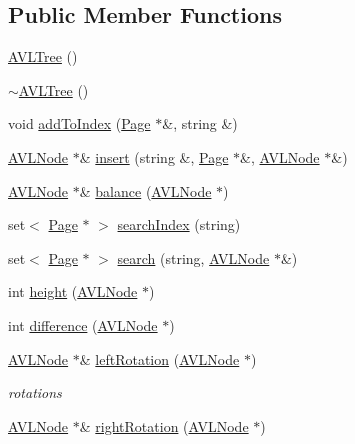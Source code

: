 \subsection*{Public Member Functions}
\begin{DoxyCompactItemize}
\item 
\hyperlink{class_a_v_l_tree_a0915d328ebed07e11087692f17d80827}{A\+V\+L\+Tree} ()
\item 
\hyperlink{class_a_v_l_tree_af4a1d1be1b6301ba59c6e101c6efc6ba}{$\sim$\+A\+V\+L\+Tree} ()
\item 
void \hyperlink{class_a_v_l_tree_acc05c3c67a02da11ae973a01c37ae89e}{add\+To\+Index} (\hyperlink{class_page}{Page} $\ast$\&, string \&)
\item 
\hyperlink{class_a_v_l_node}{A\+V\+L\+Node} $\ast$\& \hyperlink{class_a_v_l_tree_a0e9a469764ef2056ffc1257ace172612}{insert} (string \&, \hyperlink{class_page}{Page} $\ast$\&, \hyperlink{class_a_v_l_node}{A\+V\+L\+Node} $\ast$\&)
\item 
\hyperlink{class_a_v_l_node}{A\+V\+L\+Node} $\ast$\& \hyperlink{class_a_v_l_tree_a6f77603032cfc0477eae2fc8944cec75}{balance} (\hyperlink{class_a_v_l_node}{A\+V\+L\+Node} $\ast$)
\item 
set$<$ \hyperlink{class_page}{Page} $\ast$ $>$ \hyperlink{class_a_v_l_tree_a7b6bc9d63cff082843ac1de050268f2d}{search\+Index} (string)
\item 
set$<$ \hyperlink{class_page}{Page} $\ast$ $>$ \hyperlink{class_a_v_l_tree_ac439d90d1a41fc1526e5882ba25f2a5b}{search} (string, \hyperlink{class_a_v_l_node}{A\+V\+L\+Node} $\ast$\&)
\item 
int \hyperlink{class_a_v_l_tree_ad3fb38e4b3f05d203dbc1d5c87be48b0}{height} (\hyperlink{class_a_v_l_node}{A\+V\+L\+Node} $\ast$)
\item 
int \hyperlink{class_a_v_l_tree_a4ba40b6b969fe541c840ac2e3ad1dd48}{difference} (\hyperlink{class_a_v_l_node}{A\+V\+L\+Node} $\ast$)
\item 
\hyperlink{class_a_v_l_node}{A\+V\+L\+Node} $\ast$\& \hyperlink{class_a_v_l_tree_ac861efd40852530f890f75af8adb05d3}{left\+Rotation} (\hyperlink{class_a_v_l_node}{A\+V\+L\+Node} $\ast$)
\begin{DoxyCompactList}\small\item\em rotations \end{DoxyCompactList}\item 
\hyperlink{class_a_v_l_node}{A\+V\+L\+Node} $\ast$\& \hyperlink{class_a_v_l_tree_a3d119fc1729d30c627b125f01dfa713f}{right\+Rotation} (\hyperlink{class_a_v_l_node}{A\+V\+L\+Node} $\ast$)

\end{DoxyCompactItemize}
